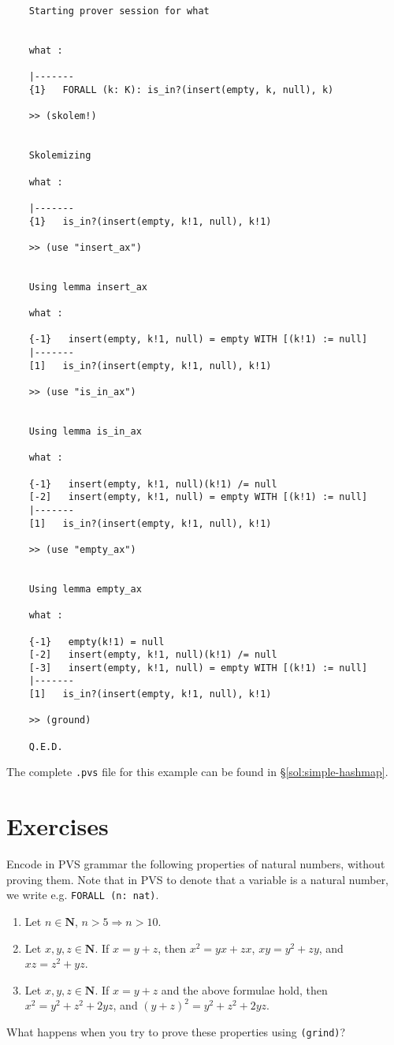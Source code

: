 \begin{verbatim}
	Starting prover session for what
	
	
	what :
	
	|-------
	{1}   FORALL (k: K): is_in?(insert(empty, k, null), k)
	
	>> (skolem!)
	
	
	Skolemizing
	
	what :
	
	|-------
	{1}   is_in?(insert(empty, k!1, null), k!1)
	
	>> (use "insert_ax")
	
	
	Using lemma insert_ax
	
	what :
	
	{-1}   insert(empty, k!1, null) = empty WITH [(k!1) := null]
	|-------
	[1]   is_in?(insert(empty, k!1, null), k!1)
	
	>> (use "is_in_ax")
	
	
	Using lemma is_in_ax
	
	what :
	
	{-1}   insert(empty, k!1, null)(k!1) /= null
	[-2]   insert(empty, k!1, null) = empty WITH [(k!1) := null]
	|-------
	[1]   is_in?(insert(empty, k!1, null), k!1)
	
	>> (use "empty_ax")
	
	
	Using lemma empty_ax
	
	what :
	
	{-1}   empty(k!1) = null
	[-2]   insert(empty, k!1, null)(k!1) /= null
	[-3]   insert(empty, k!1, null) = empty WITH [(k!1) := null]
	|-------
	[1]   is_in?(insert(empty, k!1, null), k!1)
	
	>> (ground)
	
	Q.E.D.
\end{verbatim}

The complete \texttt{.pvs} file for this example can be found in \S\ref{sol:simple-hashmap}.


\section{Exercises}

\begin{exercise}\label{ex:chapter1-1}
	Encode in PVS grammar the following properties of natural numbers, without proving them.
	Note that in PVS to denote that a variable is a natural number, we write e.g. \texttt{FORALL (n: nat)}.
	
	\begin{enumerate}
		\item Let $n \in \mathbf{N}$, $n > 5 \Rightarrow n > 10$.
		
		\item Let $x, y, z \in \mathbf{N}$. If $x = y + z$, then $x^2 = yx + zx$, $xy = y^2 + zy$, and $xz = z^2 + yz$.
		
		\item Let $x, y, z \in \mathbf{N}$. If $x = y + z$ and the above formulae hold, then $x^2 = y^2 + z^2 + 2yz$, and $(y + z)^2 = y^2 + z^2 + 2yz$.
	\end{enumerate}

	What happens when you try to prove these properties using \texttt{(grind)}?
\end{exercise}

